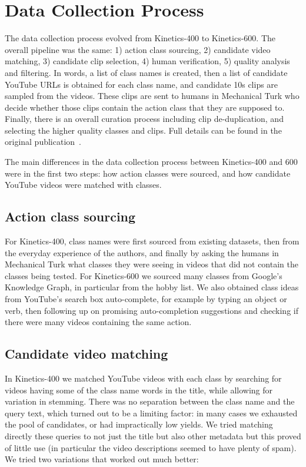 \documentclass[10pt,twocolumn,letterpaper]{article}
\begin{document}
\section{Data Collection Process \label{collection}}

The data collection process evolved from Kinetics-400 to Kinetics-600. The overall pipeline was the same: 1) action class sourcing, 2) candidate video matching, 3) candidate clip selection, 4) human verification, 5) quality analysis and filtering. In words, a list of class names is created, then a list of candidate YouTube URLs is obtained for each class name, and candidate 10s clips are sampled from the videos. These clips are sent to humans in Mechanical Turk who decide whether those clips contain the action class that they are supposed to. Finally, there is an overall curation process including clip de-duplication, and selecting the higher quality classes and clips. Full details can be found in the original publication~\cite{kay2017kinetics}. 

The main differences in the data collection process between Kinetics-400 and 600 were in the first two steps: how action classes were sourced, and how candidate YouTube videos were matched with classes.

\vspace{3mm}
\subsection{Action class sourcing} 
For Kinetics-400, class names were first sourced from existing
datasets, then from the everyday experience of the authors, and
finally by asking the humans in Mechanical Turk what classes they
were seeing in videos that did not contain the classes being tested.
For Kinetics-600 we sourced many classes from
Google's Knowledge Graph, in particular from the hobby list. We also
obtained class ideas from YouTube's search box auto-complete, for
example by typing an object or verb, then following up on promising
auto-completion suggestions and checking if there were many videos
containing the same action.

\vspace{3mm}
\subsection{Candidate video matching} 
In Kinetics-400 we matched YouTube videos with each class by searching for videos having some of the class name words in the title, while allowing for variation in stemming. There was no separation between the class name and the query text, which turned out to be a limiting factor: in many cases we exhausted the pool of candidates, or had impractically low yields. We tried matching directly these queries to not just the title but also other metadata but this proved of little use (in particular the video descriptions seemed to have plenty of spam). We tried two variations that worked out much better:
\end{document}
